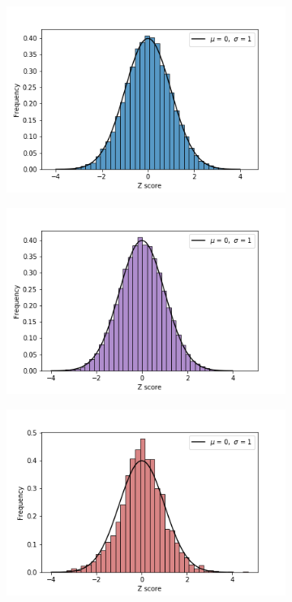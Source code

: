\begin{figure}
     \centering
     \begin{subfigure}[b]{0.3\textwidth}
         \centering
         \includegraphics[width=\textwidth]{img/zscoreCNV.png}
         \caption{}
     \end{subfigure}
     \hfill
     \begin{subfigure}[b]{0.3\textwidth}
         \centering
         \includegraphics[width=\textwidth]{img/zscoreRNA.png}
         \caption{}
     \end{subfigure}
     \hfill
     \begin{subfigure}[b]{0.3\textwidth}
         \centering
         \includegraphics[width=\textwidth]{img/zscoreMIRNA.png}

\end{subfigure}
\end{figure}
